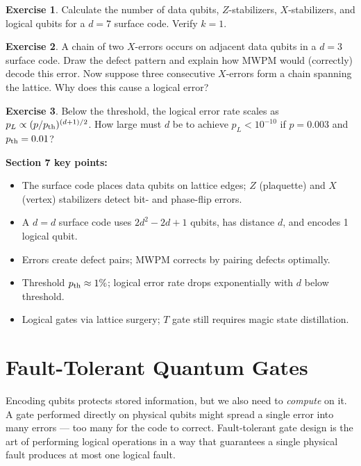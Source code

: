 \documentclass[11pt, a4paper]{article}
\theoremstyle{definition}
\newtheorem{exercise}{Exercise}[section]
\theoremstyle{plain}
\theoremstyle{remark}
\begin{document}
\begin{exercise}
Calculate the number of data qubits, $Z$-stabilizers, $X$-stabilizers, and
logical qubits for a $d=7$ surface code.  Verify $k=1$.
\end{exercise}

\begin{exercise}
A chain of two $X$-errors occurs on adjacent data qubits in a $d=3$ surface
code.  Draw the defect pattern and explain how MWPM would (correctly) decode
this error.  Now suppose three consecutive $X$-errors form a chain spanning
the lattice.  Why does this cause a logical error?
\end{exercise}

\begin{exercise}
Below the threshold, the logical error rate scales as
$p_L \propto (p/p_{\rm th})^{(d+1)/2}$.  How large must $d$ be to achieve
$p_L < 10^{-10}$ if $p = 0.003$ and $p_{\rm th} = 0.01$?
\end{exercise}

\begin{summarybox}
\textbf{Section 7 key points:}
\begin{itemize}
  \item The surface code places data qubits on lattice edges; $Z$ (plaquette)
        and $X$ (vertex) stabilizers detect bit- and phase-flip errors.
  \item A $d=d$ surface code uses $2d^2-2d+1$ qubits, has distance $d$,
        and encodes 1 logical qubit.
  \item Errors create defect pairs; MWPM corrects by pairing defects
        optimally.
  \item Threshold $p_{\rm th} \approx 1\%$; logical error rate drops
        exponentially with $d$ below threshold.
  \item Logical gates via lattice surgery; $T$ gate still requires magic
        state distillation.
\end{itemize}
\end{summarybox}

\newpage
\section{Fault-Tolerant Quantum Gates}
\label{sec:fault-tolerant}

\begin{intuition}
Encoding qubits protects stored information, but we also need to
\emph{compute} on it.  A gate performed directly on physical qubits might
spread a single error into many errors --- too many for the code to correct.
Fault-tolerant gate design is the art of performing logical operations in
a way that guarantees a single physical fault produces at most one logical
fault.
\end{intuition}
\end{document}
